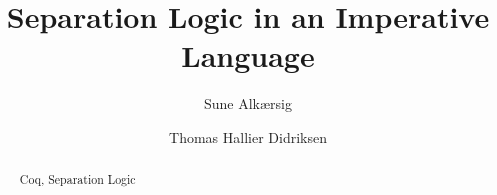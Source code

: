 \documentclass[oribibl]{llncs}
\newcommand{\keywords}[1]{\par\addvspace\baselineskip
\noindent\keywordname\enspace\ignorespaces#1}
\begin{document}

\mainmatter              %
\title{Separation Logic in an Imperative Language}

\author{Sune Alkærsig \and Thomas Hallier Didriksen\\
}



\maketitle              %

\begin{abstract}

\keywords{Coq, Separation Logic}
\end{abstract}








\end{document}

